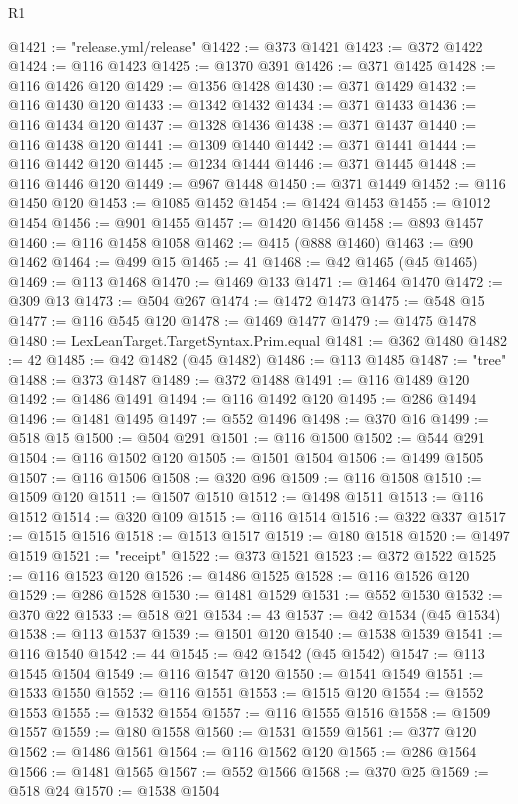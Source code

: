 \begin{lexlean}{R1}
\begin{coremodule}
@1421 := "release.yml/release"
@1422 := @373 @1421
@1423 := @372 @1422
@1424 := @116 @1423
@1425 := @1370 @391
@1426 := @371 @1425
@1428 := @116 @1426 @120
@1429 := @1356 @1428
@1430 := @371 @1429
@1432 := @116 @1430 @120
@1433 := @1342 @1432
@1434 := @371 @1433
@1436 := @116 @1434 @120
@1437 := @1328 @1436
@1438 := @371 @1437
@1440 := @116 @1438 @120
@1441 := @1309 @1440
@1442 := @371 @1441
@1444 := @116 @1442 @120
@1445 := @1234 @1444
@1446 := @371 @1445
@1448 := @116 @1446 @120
@1449 := @967 @1448
@1450 := @371 @1449
@1452 := @116 @1450 @120
@1453 := @1085 @1452
@1454 := @1424 @1453
@1455 := @1012 @1454
@1456 := @901 @1455
@1457 := @1420 @1456
@1458 := @893 @1457
@1460 := @116 @1458 @1058
@1462 := @415 (@888 @1460)
@1463 := @90 @1462
@1464 := @499 @15
@1465 := 41
@1468 := @42 @1465 (@45 @1465)
@1469 := @113 @1468
@1470 := @1469 @133
@1471 := @1464 @1470
@1472 := @309 @13
@1473 := @504 @267
@1474 := @1472 @1473
@1475 := @548 @15
@1477 := @116 @545 @120
@1478 := @1469 @1477
@1479 := @1475 @1478
@1480 := LexLeanTarget.TargetSyntax.Prim.equal
@1481 := @362 @1480
@1482 := 42
@1485 := @42 @1482 (@45 @1482)
@1486 := @113 @1485
@1487 := "tree"
@1488 := @373 @1487
@1489 := @372 @1488
@1491 := @116 @1489 @120
@1492 := @1486 @1491
@1494 := @116 @1492 @120
@1495 := @286 @1494
@1496 := @1481 @1495
@1497 := @552 @1496
@1498 := @370 @16
@1499 := @518 @15
@1500 := @504 @291
@1501 := @116 @1500
@1502 := @544 @291
@1504 := @116 @1502 @120
@1505 := @1501 @1504
@1506 := @1499 @1505
@1507 := @116 @1506
@1508 := @320 @96
@1509 := @116 @1508
@1510 := @1509 @120
@1511 := @1507 @1510
@1512 := @1498 @1511
@1513 := @116 @1512
@1514 := @320 @109
@1515 := @116 @1514
@1516 := @322 @337
@1517 := @1515 @1516
@1518 := @1513 @1517
@1519 := @180 @1518
@1520 := @1497 @1519
@1521 := "receipt"
@1522 := @373 @1521
@1523 := @372 @1522
@1525 := @116 @1523 @120
@1526 := @1486 @1525
@1528 := @116 @1526 @120
@1529 := @286 @1528
@1530 := @1481 @1529
@1531 := @552 @1530
@1532 := @370 @22
@1533 := @518 @21
@1534 := 43
@1537 := @42 @1534 (@45 @1534)
@1538 := @113 @1537
@1539 := @1501 @120
@1540 := @1538 @1539
@1541 := @116 @1540
@1542 := 44
@1545 := @42 @1542 (@45 @1542)
@1547 := @113 @1545 @1504
@1549 := @116 @1547 @120
@1550 := @1541 @1549
@1551 := @1533 @1550
@1552 := @116 @1551
@1553 := @1515 @120
@1554 := @1552 @1553
@1555 := @1532 @1554
@1557 := @116 @1555 @1516
@1558 := @1509 @1557
@1559 := @180 @1558
@1560 := @1531 @1559
@1561 := @377 @120
@1562 := @1486 @1561
@1564 := @116 @1562 @120
@1565 := @286 @1564
@1566 := @1481 @1565
@1567 := @552 @1566
@1568 := @370 @25
@1569 := @518 @24
@1570 := @1538 @1504

\end{coremodule}
\end{lexlean}
